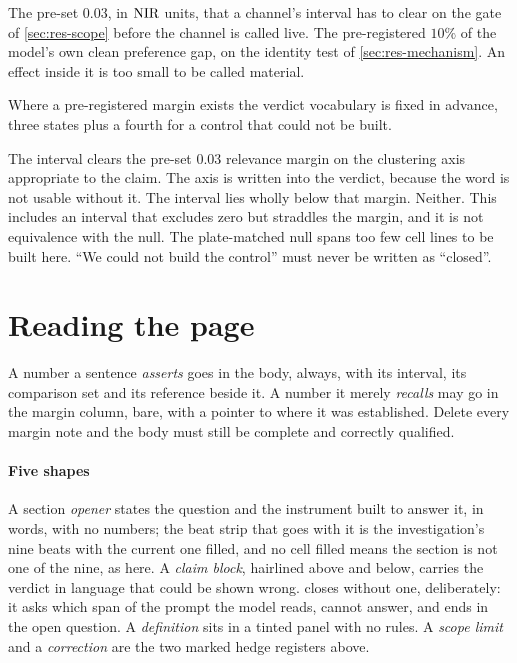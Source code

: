 \begin{description}[leftmargin=1em, itemsep=0.5ex,
                    font=\normalfont\bfseries]
 The pre-set $0.03$, in $\textrm{NIR}$ units, that
  a channel's interval has to clear on the gate of \cref{sec:res-scope} before
  the channel is called live.
 The pre-registered $10\%$ of the model's
  own clean preference gap, on the identity test of \cref{sec:res-mechanism}. An
  effect inside it is too small to be called material.
\end{description}

Where a pre-registered margin exists the verdict vocabulary is fixed in advance,
three states plus a fourth for a control that could not be built.

\begin{description}[leftmargin=1em, itemsep=0.5ex,
                    font=\normalfont\bfseries]
 The interval clears the pre-set $0.03$ relevance margin on
  the clustering axis appropriate to the claim. The axis is written into the
  verdict, because the word is not usable without it.
 The interval lies wholly below that margin.
 Neither. This includes an interval that
  excludes zero but straddles the margin, and it is not equivalence with the
  null.
 The plate-matched null spans too few cell lines
  to be built here. ``We could not build the control'' must never be written as
  ``closed''.
\end{description}

\section*{Reading the page}

\noindent
A number a sentence \emph{asserts} goes in the body, always, with its interval,
its comparison set and its reference beside it. A number it merely
\emph{recalls} may go in the margin column, bare, with a pointer to where it was
established. Delete every margin note and the body must
still be complete and correctly qualified.

\paragraph{Five shapes} A section \emph{opener} states the question and the
instrument built to answer it, in words, with no numbers; the beat strip that
goes with it is the investigation's nine beats with the current one filled, and
no cell filled means the section is not one of the nine, as here. A \emph{claim
block}, hairlined above and below, carries the verdict in language that could be
shown wrong.  closes without one, deliberately: it asks which span
of the prompt the model reads, cannot answer, and ends in the open question. A
\emph{definition} sits in a tinted panel with no rules. A \emph{scope limit} and
a \emph{correction} are the two marked hedge registers above.


